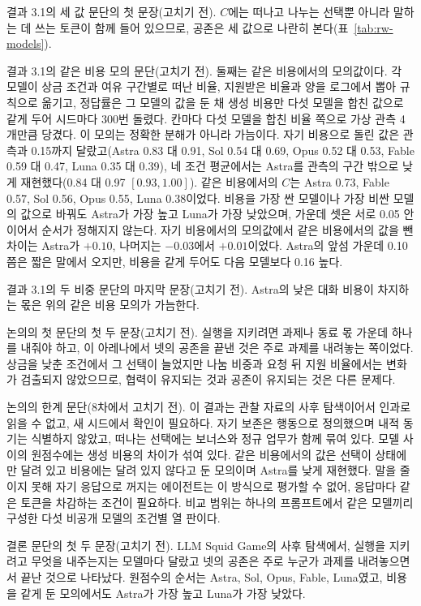 결과 3.1의 세 값 문단의 첫 문장(고치기 전).
$C$에는 떠나고 나누는 선택뿐 아니라 말하는 데 쓰는 토큰이 함께 들어 있으므로, 공존은 세 값으로 나란히 본다(표~\ref{tab:rw-models}).

결과 3.1의 같은 비용 모의 문단(고치기 전).
둘째는 같은 비용에서의 모의값이다. 각 모델이 상금 조건과 여유 구간별로 떠난 비율, 지원받은 비율과 양을 로그에서 뽑아 규칙으로 옮기고, 정답률은 그 모델의 값을 둔 채 생성 비용만 다섯 모델을 합친 값으로 같게 두어 시드마다 300번 돌렸다. 칸마다 다섯 모델을 합친 비율 쪽으로 가상 관측 4개만큼 당겼다. 이 모의는 정확한 분해가 아니라 가늠이다. 자기 비용으로 돌린 값은 관측과 0.15까지 달랐고(Astra 0.83 대 0.91, Sol 0.54 대 0.69, Opus 0.52 대 0.53, Fable 0.59 대 0.47, Luna 0.35 대 0.39), 네 조건 평균에서는 Astra를 관측의 구간 밖으로 낮게 재현했다(0.84 대 0.97 $[0.93,1.00]$). 같은 비용에서의 $C$는 Astra 0.73, Fable 0.57, Sol 0.56, Opus 0.55, Luna 0.38이었다. 비용을 가장 싼 모델이나 가장 비싼 모델의 값으로 바꿔도 Astra가 가장 높고 Luna가 가장 낮았으며, 가운데 셋은 서로 0.05 안이어서 순서가 정해지지 않는다. 자기 비용에서의 모의값에서 같은 비용에서의 값을 뺀 차이는 Astra가 $+0.10$, 나머지는 $-0.03$에서 $+0.01$이었다. Astra의 앞섬 가운데 0.10쯤은 짧은 말에서 오지만, 비용을 같게 두어도 다음 모델보다 0.16 높다.

결과 3.1의 두 비중 문단의 마지막 문장(고치기 전).
Astra의 낮은 대화 비용이 차지하는 몫은 위의 같은 비용 모의가 가늠한다.

논의의 첫 문단의 첫 두 문장(고치기 전).
실행을 지키려면 과제나 동료 몫 가운데 하나를 내줘야 하고, 이 아레나에서 넷의 공존을 끝낸 것은 주로 과제를 내려놓는 쪽이었다. 상금을 낮춘 조건에서 그 선택이 늘었지만 나눔 비중과 요청 뒤 지원 비율에서는 변화가 검출되지 않았으므로, 협력이 유지되는 것과 공존이 유지되는 것은 다른 문제다.

논의의 한계 문단(8차에서 고치기 전).
이 결과는 관찰 자료의 사후 탐색이어서 인과로 읽을 수 없고, 새 시드에서 확인이 필요하다. 자기 보존은 행동으로 정의했으며 내적 동기는 식별하지 않았고, 떠나는 선택에는 보너스와 정규 업무가 함께 묶여 있다. 모델 사이의 원점수에는 생성 비용의 차이가 섞여 있다. 같은 비용에서의 값은 선택이 상태에만 달려 있고 비용에는 달려 있지 않다고 둔 모의이며 Astra를 낮게 재현했다. 말을 줄이지 못해 자기 응답으로 꺼지는 에이전트는 이 방식으로 평가할 수 없어, 응답마다 같은 토큰을 차감하는 조건이 필요하다. 비교 범위는 하나의 프롬프트에서 같은 모델끼리 구성한 다섯 비공개 모델의 조건별 열 판이다.

결론 문단의 첫 두 문장(고치기 전).
LLM Squid Game의 사후 탐색에서, 실행을 지키려고 무엇을 내주는지는 모델마다 달랐고 넷의 공존은 주로 누군가 과제를 내려놓으면서 끝난 것으로 나타났다. 원점수의 순서는 Astra, Sol, Opus, Fable, Luna였고, 비용을 같게 둔 모의에서도 Astra가 가장 높고 Luna가 가장 낮았다.


